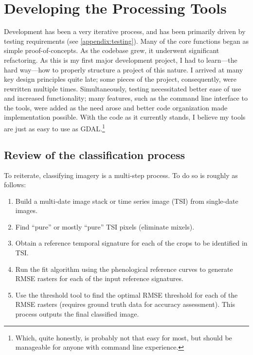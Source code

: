 \chapter{Developing the Processing Tools}
\label{appendix:tools}

Development has been a very iterative process, and has been primarily driven by testing requirements (see \autoref{appendix:testing}). Many of the core functions began as simple proof-of-concepts. As the codebase grew, it underwent significant refactoring. As this is my first major development project, I had to learn---the hard way---how to properly structure a project of this nature. I arrived at many key design principles quite late; some pieces of the project, consequently, were rewritten multiple times. Simultaneously, testing necessitated better ease of use and increased functionality; many features, such as the command line interface to the tools, were added as the need arose and better code organization made implementation possible. With the code as it currently stands, I believe my tools are just as easy to use as GDAL.\footnote{Which, quite honestly, is probably not that easy for most, but should be manageable for anyone with command line experience.}

\section{Review of the classification process}

To reiterate, classifying imagery is a multi-step process. To do so is roughly as follows:

\begin{Spacing}{1.2}
\begin{enumerate}
  \item Build a multi-date image stack or time series image (TSI) from single-date images.
  \item Find ``pure'' or mostly ``pure'' TSI pixels (eliminate mixels).
  \item Obtain a reference temporal signature for each of the crops to be identified in TSI.
  \item Run the fit algorithm using the phenological reference curves to generate RMSE rasters for each of the input reference signatures.
  \item Use the threshold tool to find the optimal RMSE threshold for each of the RMSE rasters (requires ground truth data for accuracy assessment). This process outputs the final classified image.
\end{enumerate}
\end{Spacing}

